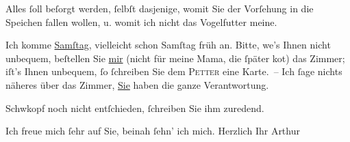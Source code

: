 \pstart
           Alles ſoll beſorgt werden, ſelbſt dasjenige, womit Sie der Vorſehung in die Speichen
               fallen wollen, u. womit ich nicht das Vogel{\pb}futter
               meine.\pend
           
\pstart
           Ich komme \uline{Samſtag}, vielleicht schon Samſtag früh an.
               Bitte, we{\geminationn}’s Ihnen nicht unbequem, beſtellen Sie \uline{mir} (nicht für meine Mama, die ſpäter ko{\geminationm}t) das
               Zimmer; iſt’s Ihnen unbequem, ſo ſchreiben Sie dem \textsc{Petter} eine {\pb}Karte. – Ich ſage nichts näheres über das
               Zimmer, \uline{Sie} haben die ganze Verantwortung.\pend
           
\pstart
           Schwkopf noch nicht entſchieden, ſchreiben Sie
               ihm zuredend.\pend
           
\pstart
           Ich freue mich ſehr auf Sie, beinah ſehn’ ich mich.\pend
           \pstart Herzlich Ihr \spacefill\mbox{Arthur}\pend{}\endnumbering{}  
      